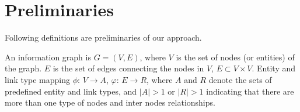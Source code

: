 


\section{Preliminaries}\label{3PD}
Following definitions are preliminaries of our approach.

\begin{definition}
An information graph is $G = (V,E)$, where $V$ is the set of nodes (or entities) of the graph. $E$ is the set of edges connecting the nodes in $V$, $E \subset V \times V$.
Entity and link type mapping $\phi$: $V \rightarrow A$, $\varphi$: $E \rightarrow R$, where $A$ and $R$ denote the sets of predefined entity and link types, and $|A| > 1$ or $|R| > 1$ indicating that there are more than one type of nodes and inter nodes relationships.
\end{definition}

